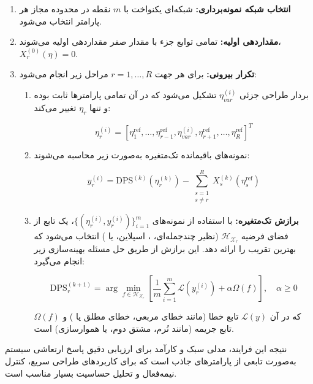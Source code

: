 \begin{enumerate}
  \item \textbf{انتخاب شبکه نمونه‌برداری:} شبکه‌ای یکنواخت با $m$ نقطه در محدوده مجاز هر پارامتر انتخاب می‌شود.
  \item \textbf{مقداردهی اولیه:} تمامی توابع جزء با مقدار صفر مقداردهی اولیه می‌شوند، $X_r^{(0)}(\eta) = 0$.
  \item \textbf{تکرار بیرونی:} برای هر جهت $r = 1,\ldots,R$ مراحل زیر انجام می‌شود:
  \begin{enumerate}
    \item بردار طراحی جزئی $\eta_{var}^{(i)}$ تشکیل می‌شود که در آن تمامی پارامترها ثابت بوده و تنها $\eta_r$ تغییر می‌کند:

    \begin{equation}
    \eta_r^{(i)} = \left[ \eta_1^{\mathrm{ref}}, \ldots, \eta_{r-1}^{\mathrm{ref}}, \eta_{var}^{(i)}, \eta_{r+1}^{\mathrm{ref}}, \ldots, \eta_R^{\mathrm{ref}} \right]^T
    \end{equation}

    \item نمونه‌های باقیمانده تک‌متغیره به‌صورت زیر محاسبه می‌شوند:

    \begin{equation}
    y_r^{(i)} = \mathrm{DPS}^{(k)}(\eta_r^{(k)}) - \sum_{\substack{s=1\\s\ne r}}^R X_s^{(k)}(\eta_s^{\mathrm{ref}})
    \end{equation}

    \item \textbf{برازش تک‌متغیره:} با استفاده از نمونه‌های $\{(\eta_r^{(i)}, y_r^{(i)})\}_{i=1}^m$، یک تابع از فضای فرضیه $\mathcal{H}_{\mathcal{X}_r}$ (نظیر چندجمله‌ای، ، اسپلاین، یا ) انتخاب می‌شود که بهترین تقریب را ارائه دهد. این برازش از طریق حل مسئله بهینه‌سازی زیر انجام می‌گیرد:

    \begin{equation}
    \mathrm{DPS}_r^{(k+1)} = \arg\min_{f \in \mathcal{H}_{\mathcal{X}_r}} \left[ \frac{1}{m} \sum_{i=1}^{m} \mathcal{L}(y_r^{(i)}) + \alpha \Omega(f) \right], \quad \alpha \geq 0
    \end{equation}

    که در آن $\mathcal{L}(y)$ تابع خطا (مانند خطای مربعی، خطای مطلق یا ) و $\Omega(f)$ تابع جریمه (مانند نُرم، مشتق دوم، یا هموارسازی) است.
  \end{enumerate}
\end{enumerate}

نتیجه این فرایند، مدلی سبک و کارآمد برای ارزیابی دقیق پاسخ ارتعاشی سیستم به‌صورت تابعی از پارامترهای جاذب است که برای کاربردهای طراحی سریع، کنترل نیمه‌فعال و تحلیل حساسیت بسیار مناسب است.

